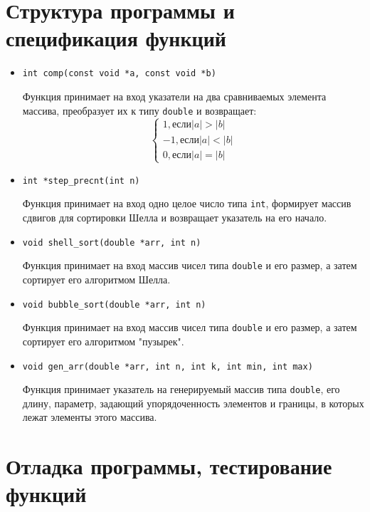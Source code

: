 \documentclass[a4paper,12pt,titlepage,finall]{article}
\begin{document}
\newpage

\section{Структура программы и спецификация функций}

\begin{flushleft}
\begin{itemize}

\item \texttt{int comp(const void *a, const void *b)}

Функция принимает на вход указатели на два сравниваемых элемента массива, преобразует их к типу \texttt{double} и возвращает:
\begin{equation*}
\begin{cases}
1, если |a| > |b|\\
-1, если |a| < |b|\\
0, если |a| = |b|
\end{cases}
\end{equation*}

\item \texttt{int *step\_precnt(int n)}

Функция принимает на вход одно целое число типа \texttt{int}, формирует массив сдвигов для сортировки Шелла и возвращает указатель на его начало.
\item \texttt{void shell\_sort(double *arr, int n)}

Функция принимает на вход массив чисел типа \texttt{double} и его размер, а затем сортирует его алгоритмом Шелла.
\item \texttt{void bubble\_sort(double *arr, int n)}

Функция принимает на вход массив чисел типа \texttt{double} и его размер, а затем сортирует его алгоритмом "пузырек".
\item \texttt{void gen\_arr(double *arr, int n, int k, int min, int max)}

Функция принимает указатель на генерируемый массив типа \texttt{double}, его длину, параметр, задающий упорядоченность элементов и 
границы, в которых лежат элементы этого массива.

\end{itemize}
\end{flushleft}

\newpage

\section{Отладка программы, тестирование функций}
\end{document}
